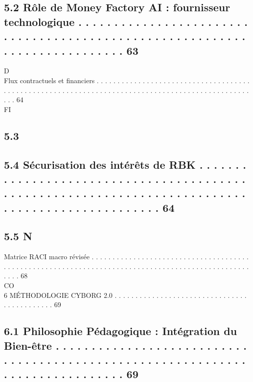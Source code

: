 \subsection{5.2     Rôle de Money Factory AI : fournisseur technologique . . . . . . . . . . . . . . . . . . . . . . . . . . . . . . . . . . . . . . . . . . . . . . . . . . . . . . . . . . . . . . . . . . . . . . . . . . . 63}
\vspace{0.5em}
\vspace{0.5em}
\vspace{0.5em}
\vspace{0.5em}
D\\
Flux contractuels et financiers . . . . . . . . . . . . . . . . . . . . . . . . . . . . . . . . . . . . . . . . . . . . . . . . . . . . . . . . . . . . . . . . . . . . . . . . . . . . . . . . . . . . . . . . . . . . . . . . . . . 64\\
\vspace{0.5em}
\vspace{0.5em}
\vspace{0.5em}
\vspace{0.5em}
FI\\
\subsection{5.3}
\subsection{5.4     Sécurisation des intérêts de RBK . . . . . . . . . . . . . . . . . . . . . . . . . . . . . . . . . . . . . . . . . . . . . . . . . . . . . . . . . . . . . . . . . . . . . . . . . . . . . . . . . . . . . . . . . . . . . . . . . 64}
\subsection{5.5                                                                         N}
Matrice RACI macro révisée . . . . . . . . . . . . . . . . . . . . . . . . . . . . . . . . . . . . . . . . . . . . . . . . . . . . . . . . . . . . . . . . . . . . . . . . . . . . . . . . . . . . . . . . . . . . . . . . . . . . . 68\\
CO\\
6       MÉTHODOLOGIE CYBORG 2.0 . . . . . . . . . . . . . . . . . . . . . . . . . . . . . . . . . . . . . . . . . . . . 69\\
\subsection{6.1     Philosophie Pédagogique : Intégration du Bien-être . . . . . . . . . . . . . . . . . . . . . . . . . . . . . . . . . . . . . . . . . . . . . . . . . . . . . . . . . . . . . . . . . . . . . . . . . . . . . . 69}
